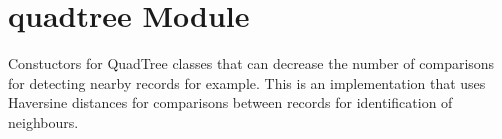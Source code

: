 \documentclass[letterpaper,10pt,english]{sphinxmanual}
\begin{document}
\section{quadtree Module}
\label{\detokenize{quadtree:module-GeoSpatialTools.quadtree}}\label{\detokenize{quadtree:quadtree-module}}
\sphinxAtStartPar
Constuctors for QuadTree classes that can decrease the number of comparisons
for detecting nearby records for example. This is an implementation that uses
Haversine distances for comparisons between records for identification of
neighbours.
\end{document}

